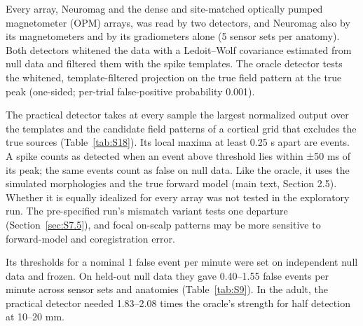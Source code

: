 \documentclass[preprint,12pt,authoryear,a4paper]{elsarticle}
\begin{document}
Every array, Neuromag and the dense and site-matched optically pumped magnetometer (OPM) arrays, was read by two detectors, and Neuromag also by its magnetometers and by its gradiometers alone (5 sensor sets per anatomy). Both detectors whitened the data with a Ledoit--Wolf covariance \citep{ledoit2004} estimated from null data and filtered them with the spike templates. The oracle detector tests the whitened, template-filtered projection on the true field pattern at the true peak (one-sided; per-trial false-positive probability 0.001).

The practical detector takes at every sample the largest normalized output over the templates and the candidate field patterns of a cortical grid that excludes the true sources (Table~\ref{tab:S18}). Its local maxima at least 0.25 s apart are events. A spike counts as detected when an event above threshold lies within ±50 ms of its peak; the same events count as false on null data. Like the oracle, it uses the simulated morphologies and the true forward model (main text, Section 2.5). Whether it is equally idealized for every array was not tested in the exploratory run. The pre-specified run's mismatch variant tests one departure (Section~\ref{sec:S7.5}), and focal on-scalp patterns may be more sensitive to forward-model and coregistration error.

Its thresholds for a nominal 1 false event per minute were set on independent null data and frozen. On held-out null data they gave 0.40–1.55 false events per minute across sensor sets and anatomies (Table~\ref{tab:S9}). In the adult, the practical detector needed 1.83–2.08 times the oracle's strength for half detection at 10–20 mm.
\end{document}
